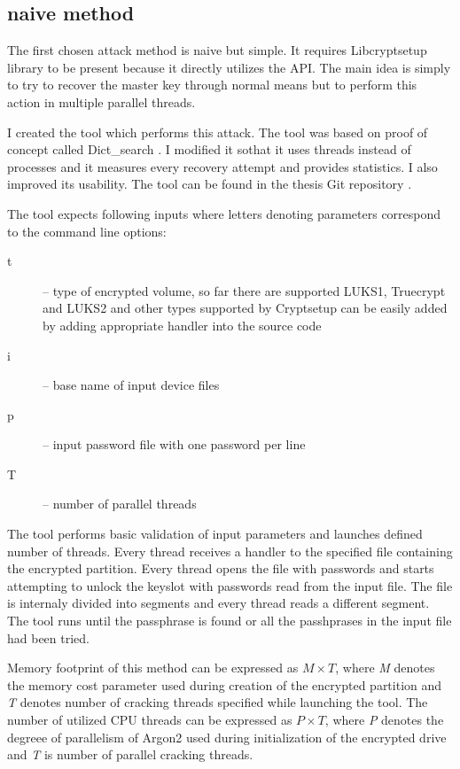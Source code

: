 \documentclass[nolof]{fithesis3}
\begin{document}
\subsection{naive method}
\label{subsec:naive}
The first chosen attack method is naive but simple. It requires Libcryptsetup library to be present because it directly utilizes the API. The main idea is simply to try to recover the master key through normal means but to perform this action in multiple parallel threads.

I created the tool which performs this attack. The tool was based on proof of concept called Dict\_search \parencite{cryptsetupdictsearch}.  I modified it sothat it uses threads instead of processes and it measures every recovery attempt and provides statistics. I also improved its usability. The tool can be found in the thesis Git repository \parencite{thesisrepo}.

The tool expects following inputs where letters denoting parameters correspond to the command line options:

\begin{description}
\item[t] -- type of encrypted volume, so far there are supported LUKS1, Truecrypt and LUKS2 and other types supported by Cryptsetup can be easily added by adding appropriate handler into the source code

\item[i] -- base name of input device files

\item[p] -- input password file with one password per line

\item[T] -- number of parallel threads
\end{description}

The tool performs basic validation of input parameters and launches defined number of threads. Every thread receives a handler to the specified file containing the encrypted partition. Every thread opens the file with passwords and starts attempting to unlock the keyslot with passwords read from the input file. The file is internaly divided into segments and every thread reads a different segment. The tool runs until the passphrase is found or all the passhprases in the input file had been tried.

Memory footprint of this method can be expressed as $M \times T$, where \emph{M} denotes the memory cost parameter used during creation of the encrypted partition and \emph{T} denotes number of cracking threads specified while launching the tool. The number of utilized CPU threads can be expressed as $P \times T$, where \emph{P} denotes the degreee of parallelism of Argon2 used during initialization of the encrypted drive and \emph{T} is number of parallel cracking threads.
\end{document}
